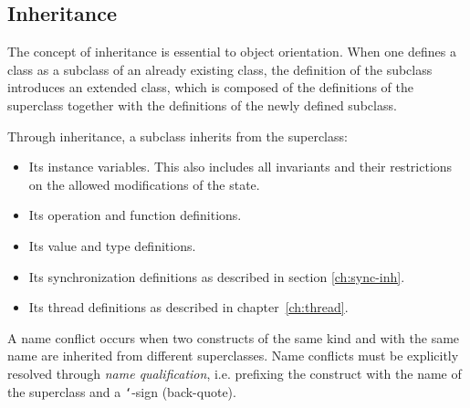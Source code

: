 \documentclass{overturerepchap}
\begin{document}
\subsection{Inheritance}\label{ch:inherit}

The concept of inheritance is essential to object orientation.  When
one defines a class as a subclass of an already existing class, the
definition of the subclass introduces an extended class, which is
composed of the definitions of the superclass together with the
definitions of the newly defined subclass. 

Through inheritance, a subclass inherits from the superclass:
\begin{itemize}
\item Its instance variables. %
  This also includes
  all invariants and their restrictions on the allowed modifications of
  the state.
\item Its operation and function definitions. 
\item Its value and type definitions.
\item Its synchronization definitions as described in
  section \ref{ch:sync-inh}.
\item Its thread definitions as described in
  chapter~\ref{ch:thread}.
\end{itemize}

A name conflict occurs when two constructs of the same kind and with the
same name are inherited from different superclasses.
Name conflicts must be explicitly resolved through {\it name qualification},
i.e. prefixing the construct with the name of the superclass and a
\texttt{`}-sign (back-quote).
\end{document}
